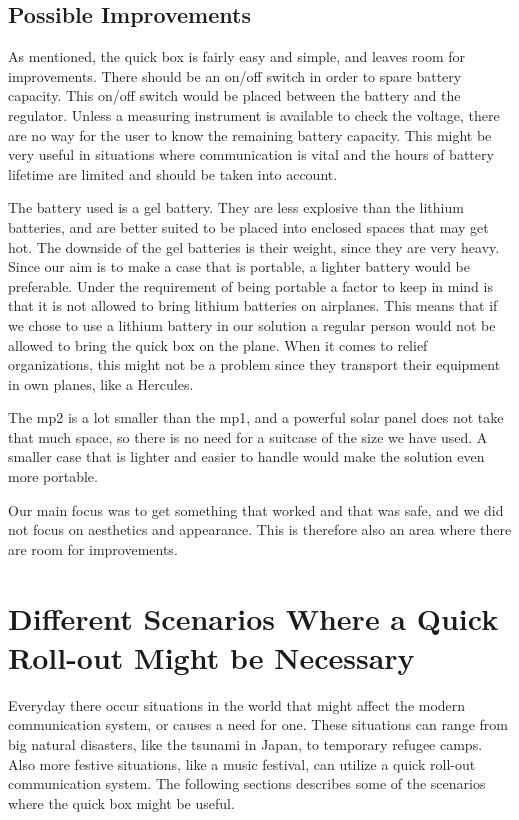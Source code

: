 \subsection{Possible Improvements}
As mentioned, the \gls {quick} box is fairly easy and simple, and leaves room for improvements. There should be an on/off switch in order to spare battery capacity. This on/off switch would be placed between the battery and the regulator. Unless a measuring instrument is available to check the voltage, there are no way for the user to know the remaining battery capacity. This might be very useful in situations where communication is vital and the hours of battery lifetime are limited and should be taken into account. 

The battery used is a gel battery. They are less explosive than the lithium batteries, and are better suited to be placed into enclosed spaces that may get hot. The downside of the gel batteries is their weight, since they are very heavy. Since our aim is to make a case that is portable, a lighter battery would be preferable. Under the requirement of being portable a factor to keep in mind is that it is not allowed to bring lithium batteries on airplanes. This means that if we chose to use a lithium battery in our solution a regular person would not be allowed to bring the \gls{quick} box on the plane. When it comes to relief organizations, this might not be a problem since they transport their equipment in own planes, like a Hercules. 

The \gls{mp2} is a lot smaller than the \gls{mp1}, and a powerful solar panel does not take that much space, so there is no need for a suitcase of the size we have used. A smaller case that is lighter and easier to handle would make the solution even more portable. 

Our main focus was to get something that worked and that was safe, and we did not focus on aesthetics and appearance. This is therefore also an area where there are room for improvements. 

 
\section{Different Scenarios Where a Quick Roll-out Might be Necessary}
Everyday there occur situations in the world that might affect the modern communication system, or causes a need for one. These situations can range from big natural disasters, like the tsunami in Japan, to temporary refugee camps. Also more festive situations, like a music festival, can utilize a quick roll-out communication system. The following sections describes some of the scenarios where the \gls{quick} box might be useful. 


